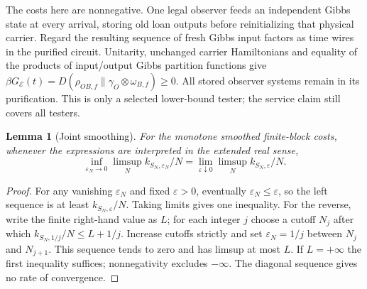 \documentclass[11pt]{article}
\newtheorem{lemma}[theorem]{Lemma}
\theoremstyle{definition}
\theoremstyle{remark}
\providecommand{\eps}{\varepsilon}
\begin{document}
The costs here are nonnegative. One legal observer feeds an independent Gibbs state at every arrival, storing old loan outputs before reinitializing that physical carrier. Regard the resulting sequence of fresh Gibbs input factors as time wires in the purified circuit. Unitarity, unchanged carrier Hamiltonians and equality of the products of input/output Gibbs partition functions give
$\beta G_{\mathcal E}(t)=D(\rho_{O B,f}\|\gamma_O\otimes\omega_{B,f})\ge0$.
All stored observer systems remain in its purification. This is only a selected lower-bound tester; the service claim still covers all testers.

\begin{lemma}[Joint smoothing]\label{sc-lem:diagonal}
For the monotone smoothed finite-block costs, whenever the expressions are interpreted in the extended real sense,
\[
\inf_{\eps_N\to0}\limsup_N k_{S_N,\eps_N}/N
=\lim_{\eps\downarrow0}\limsup_N k_{S_N,\eps}/N.
\]
\end{lemma}
\begin{proof}
For any vanishing $\eps_N$ and fixed $\eps>0$, eventually $\eps_N\le\eps$, so the left sequence is at least $k_{S_N,\eps}/N$. Taking limits gives one inequality. For the reverse, write the finite right-hand value as $L$; for each integer $j$ choose a cutoff $N_j$ after which $k_{S_N,1/j}/N\le L+1/j$. Increase cutoffs strictly and set $\eps_N=1/j$ between $N_j$ and $N_{j+1}$. This sequence tends to zero and has limsup at most $L$. If $L=+\infty$ the first inequality suffices; nonnegativity excludes $-\infty$. The diagonal sequence gives no rate of convergence.
\end{proof}
\end{document}
